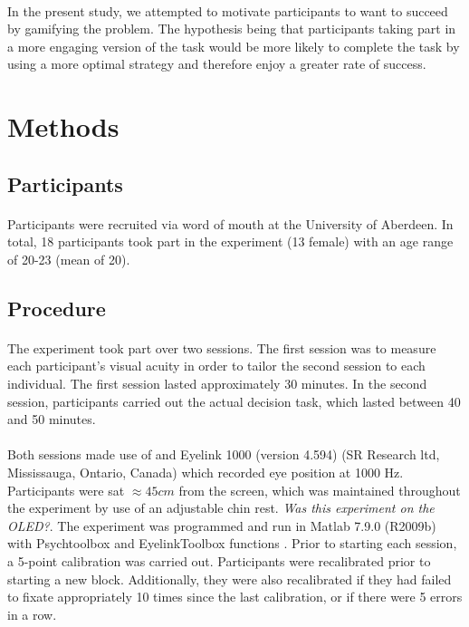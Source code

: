 \documentclass[12pt]{article}
\begin{document}
\paragraph{} In the present study, we attempted to motivate participants to want to succeed by gamifying the problem. The hypothesis being that participants taking part in a more engaging version of the task would be more likely to complete the task by using a more optimal strategy and therefore enjoy a greater rate of success. %

\section*{Methods}

\subsection*{Participants}
\paragraph{} Participants were recruited via word of mouth at the University of Aberdeen. In total, 18 participants took part in the experiment (13 female) with an age range of 20-23 (mean of 20). 

\subsection*{Procedure}
\paragraph{} The experiment took part over two sessions. The first session was to measure each participant's visual acuity in order to tailor the second session to each individual. The first session lasted approximately 30 minutes. In the second session, participants carried out the actual decision task, which lasted between 40 and 50 minutes. 

\paragraph{} Both sessions made use of and Eyelink 1000 (version 4.594) (SR Research ltd, Mississauga, Ontario, Canada) which recorded eye position at 1000 Hz. Participants were sat $\approx45cm$ from the screen, which was maintained throughout the experiment by use of an adjustable chin rest. \textit{Was this experiment on the OLED?}. The experiment was programmed and run in Matlab 7.9.0 (R2009b) with Psychtoolbox \citep{pelli1997videotoolbox} and EyelinkToolbox functions \citep{cornelissen2002eyelink}. Prior to starting each session, a 5-point calibration was carried out. Participants were recalibrated prior to starting a new block. Additionally, they were also recalibrated if they had failed to fixate appropriately 10 times since the last calibration, or if there were 5 errors in a row.
\end{document}
